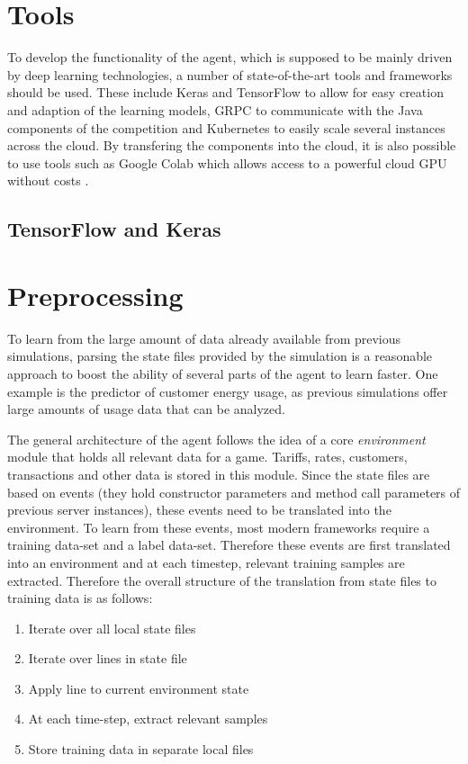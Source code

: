 \section{Tools}

To develop the functionality of the agent, which is supposed to be mainly driven by deep learning technologies, a number of state-of-the-art tools and frameworks should be used. These include Keras and TensorFlow to allow for easy creation and adaption of the learning models, \ac {GRPC} to communicate with the Java components of the competition and Kubernetes to easily scale several instances across the cloud. By transfering the components into the cloud, it is also possible to use tools such as Google Colab which allows access to a powerful cloud \ac {GPU} without costs 
\citep[]{GoogleColabOnline2018} .%


\subsection{TensorFlow and Keras}

\section{Preprocessing}

To learn from the large amount of data already available from previous simulations, parsing the state files provided by
the simulation is a reasonable approach to boost the ability of several parts of the agent to learn faster. One example
is the predictor of customer energy usage, as previous simulations offer large amounts of usage data that can be
analyzed.

The general architecture of the agent follows the idea of a core \emph{environment} module that holds all relevant
data for a game. Tariffs, rates, customers, transactions and other data is stored in this module. Since the state files
are based on events (they hold constructor parameters and method call parameters of previous server instances), these
events need to be translated into the environment. To learn from these events, most modern frameworks require a training
data-set and a label data-set. Therefore these events are first translated into an environment and at each timestep,
relevant training samples are extracted. Therefore the overall structure of the translation from state files to training
data is as follows:

\begin{enumerate}
    \item Iterate over all local state files
    \item Iterate over lines in state file
    \item Apply line to current environment state
    \item At each time-step, extract relevant samples
    \item Store training data in separate local files
\end{enumerate}

